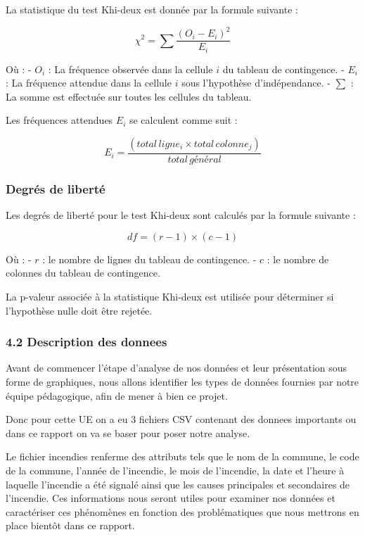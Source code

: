 \documentclass[
]{article}
\begin{document}
La statistique du test Khi-deux est donnée par la formule suivante :

\[
\chi^2 = \sum \frac{(O_i - E_i)^2}{E_i}
\]

Où : - \textbf{\(O_i\)} : La fréquence observée dans la cellule \(i\) du
tableau de contingence. - \textbf{\(E_i\)} : La fréquence attendue dans
la cellule \(i\) sous l'hypothèse d'indépendance. - \textbf{\(\sum\)} :
La somme est effectuée sur toutes les cellules du tableau.

Les fréquences attendues \(E_i\) se calculent comme suit :

\[
E_i = \frac{(total \, ligne_i \times total \, colonne_j)}{total \, général}
\]

\subsubsection{Degrés de liberté}\label{degruxe9s-de-libertuxe9}

Les degrés de liberté pour le test Khi-deux sont calculés par la formule
suivante :

\[
df = (r - 1) \times (c - 1)
\]

Où : - \textbf{\(r\)} : le nombre de lignes du tableau de contingence. -
\textbf{\(c\)} : le nombre de colonnes du tableau de contingence.

La p-valeur associée à la statistique Khi-deux est utilisée pour
déterminer si l'hypothèse nulle doit être rejetée.

\subsubsection{4.2 Description des
donnees}\label{description-des-donnees}

Avant de commencer l'étape d'analyse de nos données et leur présentation
sous forme de graphiques, nous allons identifier les types de données
fournies par notre équipe pédagogique, afin de mener à bien ce projet.

Donc pour cette UE on a eu 3 fichiers CSV contenant des donnees
importants ou dans ce rapport on va se baser pour poser notre analyse.

Le fichier incendies renferme des attributs tels que le nom de la
commune, le code de la commune, l'année de l'incendie, le mois de
l'incendie, la date et l'heure à laquelle l'incendie a été signalé ainsi
que les causes principales et secondaires de l'incendie. Ces
informations nous seront utiles pour examiner nos données et
caractériser ces phénomènes en fonction des problématiques que nous
mettrons en place bientôt dans ce rapport.
\end{document}
